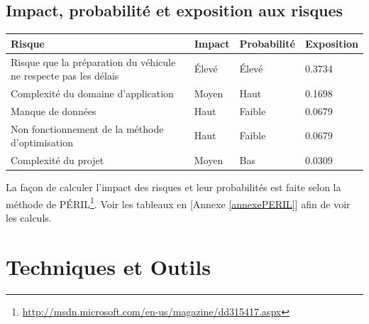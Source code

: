 \documentclass[11pt]{article}
\begin{document}
\subsection{Impact, probabilité et exposition aux risques}
\begin{table}[H]
  \begin{center}
    \begin{tabu} to \linewidth {X[3.5,l]|X[0.7,l]|X[1,l]|X[1,l]}
      Risque                              & Impact & Probabilité & Exposition \\ \hline
      Risque que la préparation du véhicule ne respecte pas les délais & Élevé & Élevé & 0.3734 \\
      Complexité du domaine d'application & Moyen & Haut   & 0.1698            \\
      Manque de données                   & Haut  & Faible & 0.0679            \\
      Non fonctionnement de la méthode d'optimisation & Haut & Faible & 0.0679 \\
      Complexité du projet                & Moyen & Bas    & 0.0309            \\
    \end{tabu}
  \end{center}
\end{table}


La façon de calculer l'impact des risques et leur probabilités est faite selon la méthode de PÉRIL\footnote{\url{http://msdn.microsoft.com/en-us/magazine/dd315417.aspx}}. Voir les tableaux en [Annexe \ref{annexePERIL}] afin de voir les calculs. 

\section{Techniques et Outils}
\end{document}
